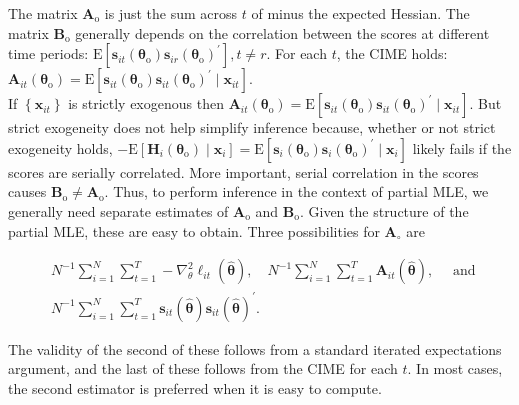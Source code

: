 \documentclass[10pt]{article}
\begin{document}
The matrix $\mathbf{A}_{\mathrm{o}}$ is just the sum across $t$ of minus the expected Hessian. The matrix $\mathbf{B}_{\mathrm{o}}$ generally depends on the correlation between the scores at different time periods: $\mathrm{E}\left[\mathbf{s}_{i t}\left(\boldsymbol{\theta}_{\mathrm{o}}\right) \mathbf{s}_{i r}\left(\boldsymbol{\theta}_{\mathrm{o}}\right)^{\prime}\right], t \neq r$. For each $t$, the CIME holds:\\
$\mathbf{A}_{i t}\left(\boldsymbol{\theta}_{\mathrm{o}}\right)=\mathrm{E}\left[\mathbf{s}_{i t}\left(\boldsymbol{\theta}_{\mathrm{o}}\right) \mathbf{s}_{i t}\left(\boldsymbol{\theta}_{\mathrm{o}}\right)^{\prime} \mid \mathbf{x}_{i t}\right]$.\\
If $\left\{\mathbf{x}_{i t}\right\}$ is strictly exogenous then $\mathbf{A}_{i t}\left(\boldsymbol{\theta}_{\mathrm{o}}\right)=\mathrm{E}\left[\mathbf{s}_{i t}\left(\boldsymbol{\theta}_{\mathrm{o}}\right) \mathbf{s}_{i t}\left(\boldsymbol{\theta}_{\mathrm{o}}\right)^{\prime} \mid \mathbf{x}_{i t}\right]$. But strict exogeneity does not help simplify inference because, whether or not strict exogeneity holds, $-\mathrm{E}\left[\mathbf{H}_{i}\left(\boldsymbol{\theta}_{\mathrm{o}}\right) \mid \mathbf{x}_{i}\right]=\mathrm{E}\left[\mathbf{s}_{i}\left(\boldsymbol{\theta}_{\mathrm{o}}\right) \mathbf{s}_{i}\left(\boldsymbol{\theta}_{\mathrm{o}}\right)^{\prime} \mid \mathbf{x}_{i}\right]$ likely fails if the scores are serially correlated. More important, serial correlation in the scores causes $\mathbf{B}_{\mathrm{o}} \neq \mathbf{A}_{\mathrm{o}}$. Thus, to perform inference in the context of partial MLE, we generally need separate estimates of $\mathbf{A}_{\mathrm{o}}$ and $\mathbf{B}_{\mathrm{o}}$. Given the structure of the partial MLE, these are easy to obtain. Three possibilities for $\mathbf{A}_{\circ}$ are


\begin{align*}
& N^{-1} \sum_{i=1}^{N} \sum_{t=1}^{T}-\nabla_{\theta}^{2} \ell_{i t}(\hat{\boldsymbol{\theta}}), \quad N^{-1} \sum_{i=1}^{N} \sum_{t=1}^{T} \mathbf{A}_{i t}(\hat{\boldsymbol{\theta}}), \quad \text { and } \\
& N^{-1} \sum_{i=1}^{N} \sum_{t=1}^{T} \mathbf{s}_{i t}(\hat{\boldsymbol{\theta}}) \mathbf{s}_{i t}(\hat{\boldsymbol{\theta}})^{\prime} . \tag{13.50}
\end{align*}


The validity of the second of these follows from a standard iterated expectations argument, and the last of these follows from the CIME for each $t$. In most cases, the second estimator is preferred when it is easy to compute.
\end{document}
